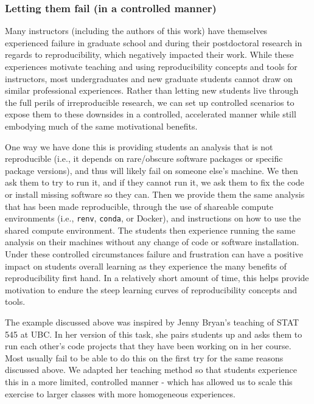 \documentclass{article}
\begin{document}
\hypertarget{letting-them-fail-in-a-controlled-manner}{%
\subsubsection{Letting them fail (in a controlled
manner)}\label{letting-them-fail-in-a-controlled-manner}}

Many instructors (including the authors of this work) have themselves
experienced failure in graduate school and during their postdoctoral
research in regards to reproducibility, which negatively impacted their
work. While these experiences motivate teaching and using
reproducibility concepts and tools for instructors, most undergraduates
and new graduate students cannot draw on similar professional
experiences. Rather than letting new students live through the full
perils of irreproducible research, we can set up controlled scenarios to
expose them to these downsides in a controlled, accelerated manner while
still embodying much of the same motivational benefits.

One way we have done this is providing students an analysis that is not
reproducible (i.e., it depends on rare/obscure software packages or
specific package versions), and thus will likely fail on someone else's
machine. We then ask them to try to run it, and if they cannot run it,
we ask them to fix the code or install missing software so they can.
Then we provide them the same analysis that has been made reproducible,
through the use of shareable compute environments (i.e., \texttt{renv},
\texttt{conda}, or Docker), and instructions on how to use the shared
compute environment. The students then experience running the same
analysis on their machines without any change of code or software
installation. Under these controlled circumstances failure and
frustration can have a positive impact on students overall learning as
they experience the many benefits of reproducibility first hand. In a
relatively short amount of time, this helps provide motivation to endure
the steep learning curves of reproducibility concepts and tools.

The example discussed above was inspired by Jenny Bryan's teaching of
STAT 545 at UBC. In her version of this task, she pairs students up and
asks them to run each other's code projects that they have been working
on in her course. Most usually fail to be able to do this on the first
try for the same reasons discussed above. We adapted her teaching method
so that students experience this in a more limited, controlled manner -
which has allowed us to scale this exercise to larger classes with more
homogeneous experiences.
\end{document}
